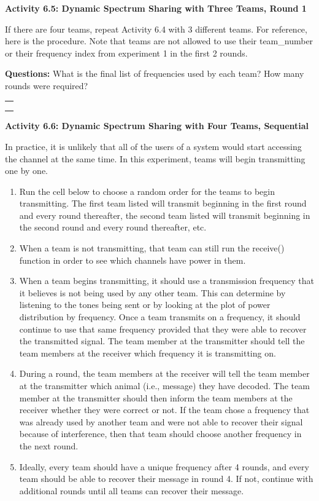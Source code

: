 \documentclass[11pt]{article}
\providecommand{\tightlist}{%
      \setlength{\itemsep}{0pt}\setlength{\parskip}{0pt}}
\begin{document}
\newpage
    \textbf{Activity 6.5: Dynamic Spectrum Sharing with Three Teams, Round
1}

If there are four teams, repeat Activity 6.4 with 3 different teams. For
reference, here is the procedure. Note that teams are not allowed to use
their team\_number or their frequency index from experiment 1 in the
first 2 rounds.

\textbf{Questions:} What is the final list of frequencies used by each
team? How many rounds were required?

\begin{longtable}[]{@{}l@{}}
\toprule
 \\
\midrule
\endhead
 \\
 \\
 \\
\bottomrule
\end{longtable}

    \textbf{Activity 6.6: Dynamic Spectrum Sharing with Four Teams,
Sequential}

In practice, it is unlikely that all of the users of a system would
start accessing the channel at the same time. In this experiment, teams
will begin transmitting one by one.

\begin{enumerate}
\def\labelenumi{\arabic{enumi}.}
\tightlist
\item
  Run the cell below to choose a random order for the teams to begin
  transmitting. The first team listed will transmit beginning in the
  first round and every round thereafter, the second team listed will
  transmit beginning in the second round and every round thereafter,
  etc.
\item
  When a team is not transmitting, that team can still run the receive()
  function in order to see which channels have power in them.
\item
  When a team begins transmitting, it should use a transmission
  frequency that it believes is not being used by any other team. This
  can determine by listening to the tones being sent or by looking at
  the plot of power distribution by frequency. Once a team transmits on
  a frequency, it should continue to use that same frequency provided
  that they were able to recover the transmitted signal. The team member
  at the transmitter should tell the team members at the receiver which
  frequency it is transmitting on.
\item
  During a round, the team members at the receiver will tell the team
  member at the transmitter which animal (i.e., message) they have
  decoded. The team member at the transmitter should then inform the
  team members at the receiver whether they were correct or not. If the
  team chose a frequency that was already used by another team and were
  not able to recover their signal because of interference, then that
  team should choose another frequency in the next round.
\item
  Ideally, every team should have a unique frequency after 4 rounds, and
  every team should be able to recover their message in round 4. If not,
  continue with additional rounds until all teams can recover their
  message.
\end{enumerate}
\end{document}
